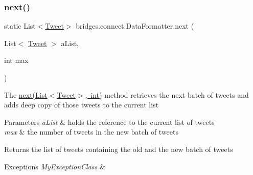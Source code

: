 \subsubsection{\texorpdfstring{next()}{next()}\hspace{0.1cm}{\footnotesize\ttfamily [1/2]}}
{\footnotesize\ttfamily static List$<$\mbox{\hyperlink{classbridges_1_1data__src__dependent_1_1_tweet}{Tweet}}$>$ bridges.\+connect.\+Data\+Formatter.\+next (\begin{DoxyParamCaption}\item[{List$<$ \mbox{\hyperlink{classbridges_1_1data__src__dependent_1_1_tweet}{Tweet}} $>$}]{a\+List,  }\item[{int}]{max }\end{DoxyParamCaption})\hspace{0.3cm}{\ttfamily [static]}}

The \mbox{\hyperlink{classbridges_1_1connect_1_1_data_formatter_a3d0b2d2e0384d2a537bb61fbeb3d00a4}{next(\+List$<$\+Tweet$>$, int)}} method retrieves the next batch of tweets and adds deep copy of those tweets to the current list 
\begin{DoxyParams}{Parameters}
{\em a\+List} & holds the reference to the current list of tweets \\
\hline
{\em max} & the number of tweets in the new batch of tweets \\
\hline
\end{DoxyParams}
\begin{DoxyReturn}{Returns}
the list of tweets containing the old and the new batch of tweets 
\end{DoxyReturn}

\begin{DoxyExceptions}{Exceptions}
{\em My\+Exception\+Class} & \\
\hline
\end{DoxyExceptions}
\mbox{\label{classbridges_1_1connect_1_1_data_formatter_ad451dd96b927702127d383e85fc98661}} 
